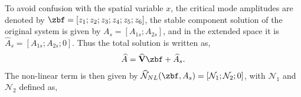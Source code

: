 To avoid confusion with the spatial variable $x$, the critical mode amplitudes are denoted by $\zbf = [z_{1};z_{2};z_{3};z_{4};z_{5};z_{6}]$, the stable component solution of the original system is given by $A_{s} = [A_{1s}; A_{2s}]$, and in the extended space it is $\widehat{A}_{s} = [A_{1s}; A_{2s}; 0]$. Thus the total solution is written as,
\begin{eqnarray}
	\widehat{A} = \widehat{\mathbf{V}}\zbf + \widehat{A}_{s}. \nonumber
\end{eqnarray}
The non-linear term is then given by $\mathcal{\widehat{N}}_{NL}(\zbf,A_{s}) = [\mathcal{N}_{1}; \mathcal{N}_{2}; 0]$, with $\mathcal{N}_{1}$ and $\mathcal{N}_{2}$ defined as, 
